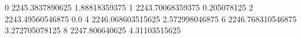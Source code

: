 0 2245.3837890625 1.88818359375
1 2243.70068359375 0.205078125
2 2243.49560546875 0.0
4 2246.068603515625 2.572998046875
6 2246.768310546875 3.272705078125
8 2247.806640625 4.31103515625
